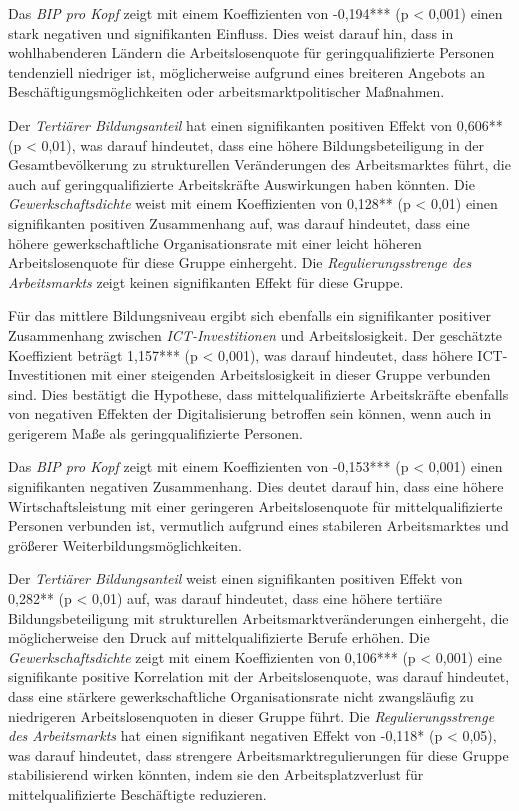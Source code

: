 Das \textit{\ac{BIP} pro Kopf} zeigt mit einem Koeffizienten von -0,194*** (p < 0,001)
einen stark negativen und signifikanten Einfluss. Dies weist darauf hin, dass in wohlhabenderen
Ländern die Arbeitslosenquote für geringqualifizierte Personen tendenziell niedriger ist,
möglicherweise aufgrund eines breiteren Angebots an Beschäftigungsmöglichkeiten oder
arbeitsmarktpolitischer Maßnahmen.

Der \textit{Tertiärer Bildungsanteil} hat einen signifikanten positiven Effekt von 0,606**
(p < 0,01), was darauf hindeutet, dass eine höhere Bildungsbeteiligung in der Gesamtbevölkerung
zu strukturellen Veränderungen des Arbeitsmarktes führt, die auch auf geringqualifizierte Arbeitskräfte
Auswirkungen haben könnten. Die \textit{Gewerkschaftsdichte} weist mit einem Koeffizienten von 0,128**
(p < 0,01) einen signifikanten positiven Zusammenhang auf, was darauf hindeutet, dass eine höhere
gewerkschaftliche Organisationsrate mit einer leicht höheren Arbeitslosenquote für diese Gruppe
einhergeht. Die \textit{Regulierungsstrenge des Arbeitsmarkts} zeigt keinen signifikanten Effekt für
diese Gruppe.

Für das mittlere Bildungsniveau ergibt sich ebenfalls ein signifikanter positiver Zusammenhang
zwischen \textit{\ac{ICT}-Investitionen} und Arbeitslosigkeit. Der geschätzte Koeffizient beträgt
1,157*** (p < 0,001), was darauf hindeutet, dass höhere \ac{ICT}-Investitionen mit einer steigenden
Arbeitslosigkeit in dieser Gruppe verbunden sind. Dies bestätigt die Hypothese, dass mittelqualifizierte
Arbeitskräfte ebenfalls von negativen Effekten der Digitalisierung betroffen sein können, wenn auch in
gerigerem Maße als geringqualifizierte Personen.

Das \textit{\ac{BIP} pro Kopf} zeigt mit einem Koeffizienten von -0,153*** (p < 0,001) einen signifikanten
negativen Zusammenhang. Dies deutet darauf hin, dass eine höhere Wirtschaftsleistung mit einer geringeren
Arbeitslosenquote für mittelqualifizierte Personen verbunden ist, vermutlich aufgrund eines stabileren
Arbeitsmarktes und größerer Weiterbildungsmöglichkeiten.

Der \textit{Tertiärer Bildungsanteil} weist einen signifikanten positiven Effekt von 0,282**
(p < 0,01) auf, was darauf hindeutet, dass eine höhere tertiäre Bildungsbeteiligung mit strukturellen
Arbeitsmarktveränderungen einhergeht, die möglicherweise den Druck auf mittelqualifizierte Berufe erhöhen.
Die \textit{Gewerkschaftsdichte} zeigt mit einem Koeffizienten von 0,106*** (p < 0,001) eine signifikante
positive Korrelation mit der Arbeitslosenquote, was darauf hindeutet, dass eine stärkere gewerkschaftliche
Organisationsrate nicht zwangsläufig zu niedrigeren Arbeitslosenquoten in dieser Gruppe führt. Die
\textit{Regulierungsstrenge des Arbeitsmarkts} hat einen signifikant negativen Effekt von -0,118*
(p < 0,05), was darauf hindeutet, dass strengere Arbeitsmarktregulierungen für diese Gruppe
stabilisierend wirken könnten, indem sie den Arbeitsplatzverlust für mittelqualifizierte Beschäftigte 
reduzieren.

